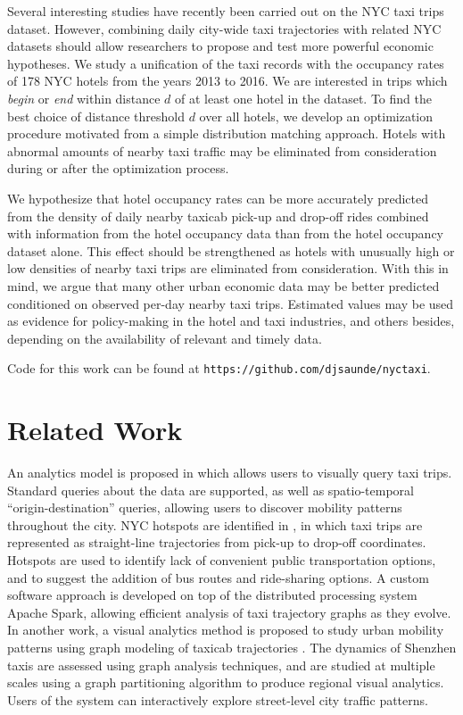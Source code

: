 \documentclass[useAMS, usenatbib]{biom}
\begin{document}
Several interesting studies have recently been carried out on the NYC taxi trips dataset. However, combining daily city-wide taxi trajectories with related NYC datasets should allow researchers to propose and test more powerful economic hypotheses. We study a unification of the taxi records with the occupancy rates of 178 NYC hotels from the years 2013 to 2016. We are interested in trips which \textit{begin} or \textit{end} within distance $d$ of at least one hotel in the dataset. To find the best choice of distance threshold $d$ over all hotels, we develop an optimization procedure motivated from a simple distribution matching approach. Hotels with abnormal amounts of nearby taxi traffic may be eliminated from consideration during or after the optimization process.

We hypothesize that hotel occupancy rates can be more accurately predicted from the density of daily nearby taxicab pick-up and drop-off rides combined with information from the hotel occupancy data than from the hotel occupancy dataset alone. This effect should be strengthened as hotels with unusually high or low densities of nearby taxi trips are eliminated from consideration. With this in mind, we argue that many other urban economic data may be better predicted conditioned on observed per-day nearby taxi trips. Estimated values may be used as evidence for policy-making in the hotel and taxi industries, and others besides, depending on the availability of relevant and timely data.

Code for this work can be found at \texttt{https://github.com/djsaunde/nyctaxi}.

\section{Related Work}
\label{s:related}

An analytics model is proposed in \citet{Ferreira2013VisualEO} which allows users to visually query taxi trips. Standard queries about the data are supported, as well as spatio-temporal ``origin-destination'' queries, allowing users to discover mobility patterns throughout the city. NYC hotspots are identified in \citet{Stoyanovich2017ZoomingIO}, in which taxi trips are represented as straight-line trajectories from pick-up to drop-off coordinates. Hotspots are used to identify lack of convenient public transportation options, and to suggest the addition of bus routes and ride-sharing options. A custom software approach is developed on top of the distributed processing system Apache Spark, allowing efficient analysis of taxi trajectory graphs as they evolve. In another work, a visual analytics method is proposed to study urban mobility patterns using graph modeling of taxicab trajectories \citep{Huang2016TrajGraphAG}. The dynamics of Shenzhen taxis are assessed using graph analysis techniques, and are studied at multiple scales using a graph partitioning algorithm to produce regional visual analytics. Users of the system can interactively explore street-level city traffic patterns. 
\end{document}
